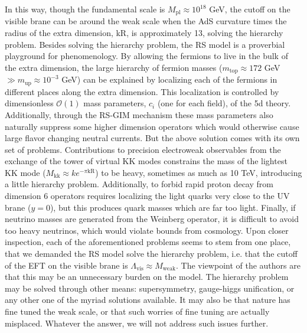 \documentclass[aps,onecolumn,twoside,secnumarabic,balancelastpage,amsmath,amssymb,nofootinbib,hyperref=pdftex]{revtex4}
\begin{document}
In this way, though the fundamental scale is $M_{\text{pl}} \approx 10^{18}$ GeV, the cutoff on the visible brane can be around the weak scale when the AdS curvature times the radius of the extra dimension, kR, is approximately 13, solving the hierarchy problem. 
\vskip 0.12in
Besides solving the hierarchy problem, the RS model is a proverbial playground for phenomenology. By allowing the fermions to live in the bulk of the extra dimension, the large hierarchy of fermion masses ($m_{\text{top}} \approx 172$ GeV $\gg m_{\text{up}} \approx 10^{-3}$ GeV) can be explained by localizing each of the fermions in different places along the extra dimension\cite{GP}. This localization is controlled by dimensionless $\mathcal{O}(1)$ mass parameters, $c_i$ (one for each field), of the 5d theory. Additionally, through the RS-GIM mechanism these mass parameters also naturally suppress some higher dimension operators which would otherwise cause large flavor changing neutral currents. 
\vskip 0.12in
But the above solution comes with its own set of problems. Contributions to precision electroweak observables from the exchange of the tower of virtual KK modes constrains the mass of the lightest KK mode ($M_{\text{kk}} \approx k e^{-\pi\text{kR}}$) to be heavy, sometimes as much as 10 TeV, introducing a little hierarchy problem. Additionally, to forbid rapid proton decay from dimension 6 operators requires localizing the light quarks very close to the UV brane ($y=0$), but this produces quark masses which are far too light. Finally, if neutrino masses are generated from the Weinberg operator, it is difficult to avoid too heavy neutrinos, which would violate bounds from cosmology.
\vskip 0.12in
Upon closer inspection, each of the aforementioned problems seems to stem from one place, that we demanded the RS model solve the hierarchy problem, i.e. that the cutoff of the EFT on the visible brane is $\Lambda_{\text{vis}} \approx M_{\text{weak}}$. The viewpoint of the authors are that this may be an unnecessary burden on the model. The hierarchy problem may be solved through other means: supersymmetry, gauge-higgs unification, or any other one of the myriad solutions available. It may also be that nature has fine tuned the weak scale, or that such worries of fine tuning are actually misplaced. Whatever the answer, we will not address such issues further. 
\vskip 0.12in
\end{document}
